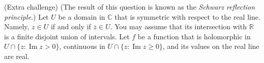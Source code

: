 \documentclass[answers]{exam}
\begin{document}
\begin{questions}



\question%
(Extra challenge) (The result of this question is known as the \emph{Schwarz reflection principle}.) Let $U$ be a domain in $\mathbb C$ that is symmetric with respect to the real line. Namely, $z\in U$ if and only if $\overline z\in U$. You may assume that its intersection with $\mathbb R$ is a finite disjoint union of intervals. Let $f$ be a function that is holomorphic in $U\cap\{z:\operatorname{Im}z>0\}$, continuous in $U\cap\{z:\operatorname{Im}z\geq0\}$, and its values on the real line are real.

\end{questions}
\end{document}
